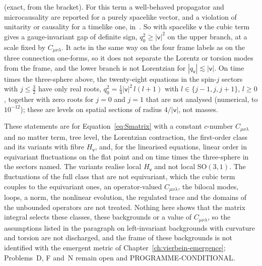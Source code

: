 (exact, from the bracket). For this term a well-behaved propagator and microcausality are reported for a purely spacelike vector, and a violation of unitarity or causality for a timelike one, in~\cite{AdamKlinkhamer2001}. So with spacelike \(\mathsf v\) the cubic term gives a gauge-invariant gap of definite sign, \(q_0^2\ge|\mathsf v|^2\) on the upper branch, at a scale fixed by \(C_{\mu\nu\lambda}\). It acts in the same way on the four frame labels as on the three connection one-forms, so it does not separate the Lorentz or torsion modes from the frame, and the lower branch is not Lorentzian for \(|q_{\mathsf v}|\lesssim|\mathsf v|\). On time times the three-sphere above, the twenty-eight equations in the spin-\(j\) sectors with \(j\le\tfrac32\) have only real roots, \(q_0^2=\tfrac14|\mathsf v|^2\,l(l+1)\) with \(l\in\{j-1,j,j+1\}\), \(l\ge0\), together with zero roots for \(j=0\) and \(j=1\) that are not analysed (numerical, to \(10^{-12}\)); these are levels on spatial sections of radius \(4/|\mathsf v|\), not masses.

These statements are for Equation~\eqref{eq:Smatrix} with a constant \(c\)-number \(C_{\mu\nu\lambda}\) and no matter term, tree level, the Lorentzian contraction, the first-order class and its variants with fibre \(H_{\mathsf v}\), and, for the linearised equations, linear order in equivariant fluctuations on the flat point and on time times the three-sphere in the sectors named. The variants realise local \(H_{\mathsf v}\) and not local \(\mathrm{SO}(3,1)\). The fluctuations of the full class that are not equivariant, which the cubic term couples to the equivariant ones, an operator-valued \(C_{\mu\nu\lambda}\), the bilocal modes, loops, a norm, the nonlinear evolution, the regulated trace and the domains of the unbounded operators are not treated. Nothing here shows that the matrix integral selects these classes, these backgrounds or a value of \(C_{\mu\nu\lambda}\), so the assumptions listed in the paragraph on left-invariant backgrounds with curvature and torsion are not discharged, and the frame of these backgrounds is not identified with the emergent metric of Chapter~\ref{ch:vierbein-emergence}; Problems~D, F and~N remain open and PROGRAMME-CONDITIONAL.
